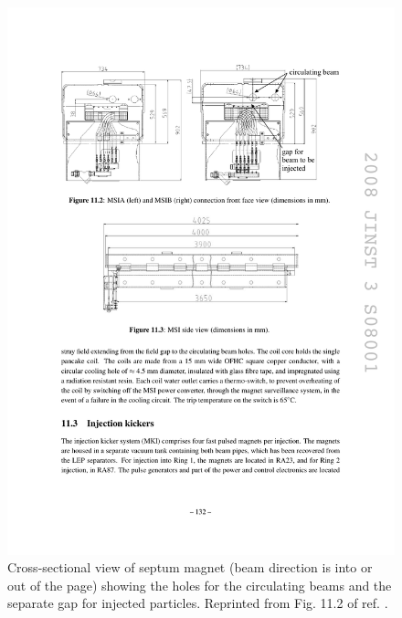 \documentclass[dissertation.tex]{subfiles}
\begin{document}
\begin{figure}
	\centering
	\includegraphics[scale=1.0]{LHC_septum_cross_section}
	\caption{Cross-sectional view of septum magnet (beam direction is into or out of the page) showing the holes for the circulating beams and the separate gap for injected particles.  Reprinted from Fig. 11.2 of ref. \cite{1748-0221-3-08-S08001}.}
	\label{fig:LHC_septum_cross_section}
\end{figure}
\end{document}
